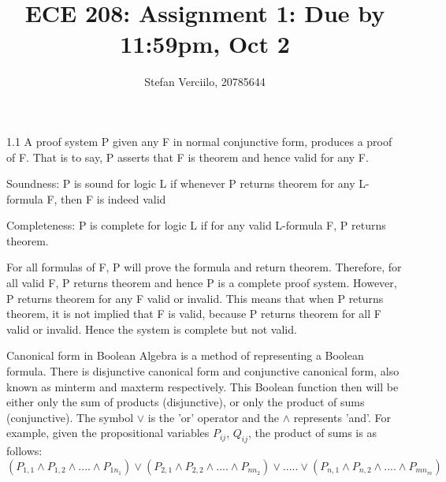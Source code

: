 \documentclass[11pt]{article}
\begin{document}
\author{Stefan Verciilo, 20785644}
\title {ECE 208: Assignment 1: Due by 11:59pm, Oct 2}
\maketitle

\medskip


\begin{enumerate}


\newline 

1.1 
\newline
A proof system P given any F in normal conjunctive form, produces a proof of F. That is to say, P asserts that F is theorem and hence valid for any F.  

\newline
\newline
Soundness: P is sound for logic L if whenever P returns theorem for any L-formula F, then F is indeed valid
\newline
\newline

Completeness: P is complete for logic L if for any valid L-formula F, P returns theorem.

\newline
\newline

For all formulas of F, P will prove the formula and return theorem. Therefore, for all valid F, P returns theorem and hence P is a complete proof system. However, P returns theorem for any F valid or invalid. This means that when P returns theorem, it is not implied that F is valid, because P returns theorem for all F valid or invalid. Hence the system is complete but not valid.
\newline
\newline
 

\newline
{} 
\newline 
Canonical form in Boolean Algebra is a method of representing a Boolean formula. There is disjunctive canonical form and conjunctive canonical form, also known as minterm and maxterm respectively. This Boolean function then will be either only the sum of products (disjunctive), or only the product of sums (conjunctive). The symbol $\lor$ is the 'or' operator and the $\land$ represents 'and'. 
For example, given the propositional variables $P_{ij}$, $Q_{ij}$, the product of sums is as follows: 
\begin{equation}
    (P_{1,1} \land P_{1,2} \land .... \land P_{1{n_1}}) \lor     (P_{2,1} \land P_{2,2} \land .... \land P_{n{n_2}}) \lor ..... 
    \lor     (P_{n,1} \land P_{n,2} \land .... \land P_{m{n_m}})
\end{equation}


\end{enumerate}
\end{document}

